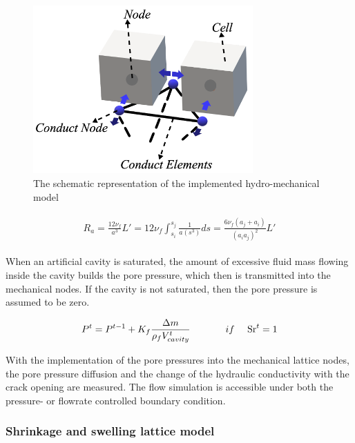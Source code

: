 \begin{figure}[!ht]
\centering
\includegraphics[width=0.75\textwidth]{figures/Amir_LEM_Hydro.png}
\caption{The schematic representation of the implemented hydro-mechanical model}
\label{fig:Amir_LEM_Hydro}
\end{figure}

\begin{align}
\label{eq:LEM_Hydro_2}
\begin{split}
R_a = \frac{12\nu_f}{a^3} L'  
= 12 \nu_f \int_{s_i}^{s_j} \frac{1}{a (s^3)} ds 
= \frac{6 \nu_f (a_j+a_i)}{(a_i a_j)^2} L'
\end{split}
\end{align} 

When an artificial cavity is saturated, the amount of excessive fluid mass flowing inside the cavity builds the pore pressure, which then is transmitted into the mechanical nodes. If the cavity is not saturated, then the pore pressure is assumed to be zero. 

\begin{align}
\label{eq:LEM_Hydro_3}
\begin{split}
P^t=P^{t-1}+K_f\frac{\Delta m}{\rho_fV_{cavity}^t}\ \ \ \ \ \ \ \ \ \ \ if\ \ \ \ {\rm Sr}^t=1
\end{split}
\end{align} 

With the implementation of the pore pressures into the mechanical lattice nodes, the pore pressure diffusion and the change of the hydraulic conductivity with the crack opening are measured. The flow simulation is accessible under both the pressure- or flowrate controlled boundary condition.


\subsubsection*{Shrinkage and swelling lattice model} 

